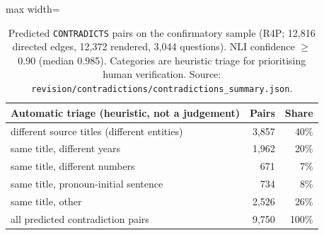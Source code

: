 \begin{table}[t]
\centering
\footnotesize
\begin{adjustbox}{max width=\linewidth}
\begin{tabular}{@{}lrr@{}}
\toprule
Automatic triage (heuristic, not a judgement) & Pairs & Share \\
\midrule
different source titles (different entities) & 3,857 & 40\% \\
same title, different years & 1,962 & 20\% \\
same title, different numbers & 671 & 7\% \\
same title, pronoun-initial sentence & 734 & 8\% \\
same title, other & 2,526 & 26\% \\
\midrule
all predicted contradiction pairs & 9,750 & 100\% \\
\bottomrule
\end{tabular}
\end{adjustbox}
\caption{Predicted \texttt{CONTRADICTS} pairs on the confirmatory sample (R4P; 12,816 directed edges, 12,372 rendered, 3,044 questions). NLI confidence $\geq$0.90 (median 0.985). Categories are heuristic triage for prioritising human verification. Source: \texttt{revision/\allowbreak contradictions/\allowbreak contradictions\_summary.json}.}
\label{tab:contra-triage}
\end{table}
